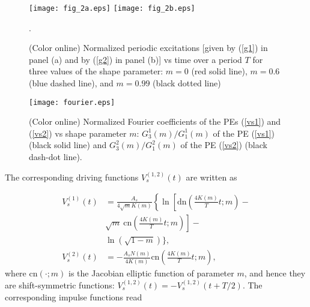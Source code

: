 \documentclass[showpacs,preprintnumbers,10pt,onecolumn]{revtex4}%
\begin{document}
\begin{figure}[ptb]
\texttt{[image: fig\_2a.eps]}
\texttt{[image: fig\_2b.eps]}
\caption{(Color online)
Normalized periodic excitations [given by (\ref{g1}) in panel (a) and by (\ref{g2}) in panel (b)]
vs time over
a period $T$ for three values of the shape parameter: $m=0$
(red solid line), $m=0.6$ (blue dashed
line), and $m=0.99$ (black dotted line)}.%
\label{driving}%
\end{figure}


\begin{figure}[h]
\texttt{[image: fourier.eps]}
\caption{(Color online) Normalized Fourier coefficients of the PEs (\ref{vs1}) and (\ref{vs2}) vs
shape parameter $m$: $G^1_{3}(m)/G^1_{1}(m)$ of the PE (\ref{vs1}) (black solid line) and
$G^2_{3}(m)/G^2_{1}(m)$ of the PE (\ref{vs2}) (black dash-dot line).}%
\label{fourier}%
\end{figure}





The corresponding driving functions $V_{s}^{\left(  1,2\right)
}(t)$ are written as%

\begin{align}
V_{s}^{(1)}(t) &  =\frac{A_{s}}{4\sqrt{m}K(m)}\left\{  \ln\left[
\text{dn}\left(  \frac{4K(m)}{T}t;m\right)  \right.  \right.  -\nonumber\\
&  \left.  \left.  \sqrt{m}\medspace\text{cn}\left(  \frac{4K(m)}%
{T}t;m\right)  \right]  -\right.  \nonumber\\
&  \left.  \ln\left(  \sqrt{1-m}\right)  \right.  \bigg\},\label{vs1}\\
V_{s}^{(2)}(t) &  =-\frac{A_{s}N(m)}{4K(m)}\text{cn}\left(  \frac{4K(m)}%
{T}t;m\right)  ,\label{vs2}%
\end{align}
where $\text{cn}(\cdot;m)$ is the Jacobian elliptic function of parameter $m$,
and hence they are shift-symmetric functions: $V_{s}^{(1,2)}(t)=-V_{s}%
^{(1,2)}(t+T/2)$. The corresponding impulse functions read
\end{document}
